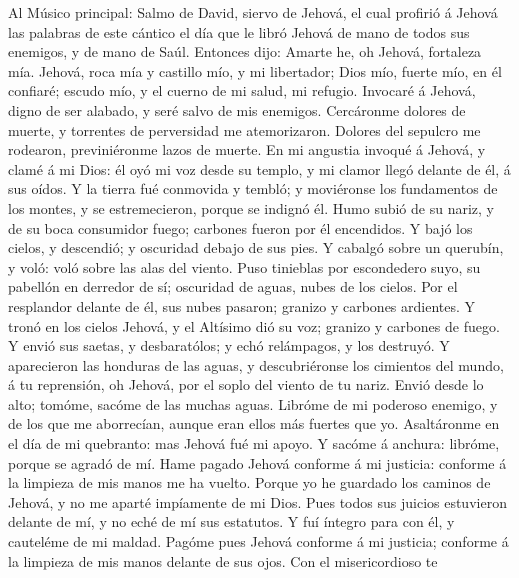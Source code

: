  Al Músico principal: Salmo de David, siervo de Jehová, el
cual profirió á Jehová las palabras de este cántico el día que le libró
Jehová de mano de todos sus enemigos, y de mano de Saúl. Entonces dijo:
Amarte he, oh Jehová, fortaleza mía.  Jehová, roca mía y
castillo mío, y mi libertador; Dios mío, fuerte mío, en él confiaré;
escudo mío, y el cuerno de mi salud, mi refugio.  Invocaré
á Jehová, digno de ser alabado, y seré salvo de mis enemigos.
 Cercáronme dolores de muerte, y torrentes de perversidad
me atemorizaron.  Dolores del sepulcro me rodearon,
previniéronme lazos de muerte.  En mi angustia invoqué á
Jehová, y clamé á mi Dios: él oyó mi voz desde su templo, y mi clamor
llegó delante de él, á sus oídos.  Y la tierra fué
conmovida y tembló; y moviéronse los fundamentos de los montes, y se
estremecieron, porque se indignó él.  Humo subió de su
nariz, y de su boca consumidor fuego; carbones fueron por él encendidos.
 Y bajó los cielos, y descendió; y oscuridad debajo de sus
pies.  Y cabalgó sobre un querubín, y voló: voló sobre
las alas del viento.  Puso tinieblas por escondedero
suyo, su pabellón en derredor de sí; oscuridad de aguas, nubes de los
cielos.  Por el resplandor delante de él, sus nubes
pasaron; granizo y carbones ardientes.  Y tronó en los
cielos Jehová, y el Altísimo dió su voz; granizo y carbones de fuego.
 Y envió sus saetas, y desbaratólos; y echó relámpagos, y
los destruyó.  Y aparecieron las honduras de las aguas, y
descubriéronse los cimientos del mundo, á tu reprensión, oh Jehová, por
el soplo del viento de tu nariz.  Envió desde lo alto;
tomóme, sacóme de las muchas aguas.  Libróme de mi
poderoso enemigo, y de los que me aborrecían, aunque eran ellos más
fuertes que yo.  Asaltáronme en el día de mi quebranto:
mas Jehová fué mi apoyo.  Y sacóme á anchura: libróme,
porque se agradó de mí.  Hame pagado Jehová conforme á mi
justicia: conforme á la limpieza de mis manos me ha vuelto.
 Porque yo he guardado los caminos de Jehová, y no me
aparté impíamente de mi Dios.  Pues todos sus juicios
estuvieron delante de mí, y no eché de mí sus estatutos. 
Y fuí íntegro para con él, y cauteléme de mi maldad. 
Pagóme pues Jehová conforme á mi justicia; conforme á la limpieza de mis
manos delante de sus ojos.  Con el misericordioso te
